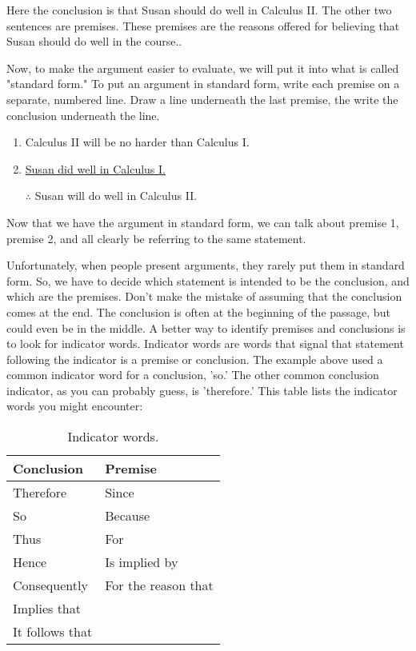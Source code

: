 \documentclass[../logic-text.tex]{subfiles}
\begin{document}
Here the conclusion is that Susan should do well in Calculus II.
The other two sentences are premises.
These premises are the reasons offered for believing that Susan should do well in the course..


Now, to make the argument easier to evaluate, we will put it into what is called "standard form." To put an argument in standard form, write each premise on a separate, numbered line. Draw a line underneath the last premise, the write the conclusion underneath the line.


\begin{enumerate}
\item Calculus II will be no harder than Calculus I.
\item \underline{Susan did well in Calculus I.}
\item [$\therefore$] Susan will do well in Calculus II.
\end{enumerate}

Now that we have the argument in standard form, we can talk about premise 1, premise 2, and all clearly be referring to the same statement.

Unfortunately, when people present arguments, they rarely put them in standard form. So, we have to decide which statement is intended to be the conclusion, and which are the premises. Don't make the mistake of assuming that the conclusion comes at the end. The conclusion is often at the beginning of the passage, but could even be in the middle. A better way to identify premises and conclusions is to look for indicator words. Indicator words are words that signal that statement following the indicator is a premise or conclusion. The example above used a common indicator word for a conclusion, 'so.' The other common conclusion indicator, as you can probably guess, is 'therefore.' This table lists the indicator words you might encounter: \newpage

\begin{table}[]
  \centering
\begin{tabular}{@{}ll@{}}
\textbf{Conclusion}      & \textbf{Premise}             \\ \midrule
Therefore       & Since               \\
So              & Because             \\
Thus            & For                 \\
Hence           & Is implied by       \\
Consequently    & For the reason that \\
Implies that    &                     \\
It follows that &                    
\end{tabular}
\caption{\label{indicators-table}Indicator words.}
\end{table}
\end{document}
